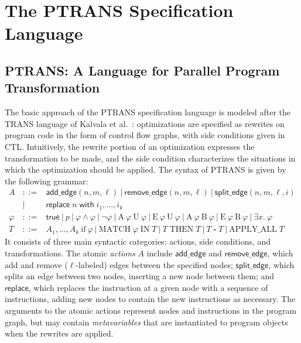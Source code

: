 \documentclass{eptcs}
\newcommand{\ignore}[1]{{}}
\newcommand{\ptrans}[0]{PTRANS}
\newcommand{\AU}[2]{\textrm{A}\ #1\ \textrm{U}\ #2}
\newcommand{\EU}[2]{\textrm{E}\ #1\ \textrm{U}\ #2}
\newcommand{\EB}[2]{\textrm{E}\ #1\ \textrm{B}\ #2}
\newcommand{\AB}[2]{\textrm{A}\ #1\ \textrm{B}\ #2}
\begin{document}
\section{The {\ptrans} Specification Language}
\label{framework}
\subsection{{\ptrans}: A Language for Parallel Program Transformation}
The basic approach of the {\ptrans} specification language is modeled after the TRANS language of Kalvala et al.~\cite{kalvala}: optimizations are specified as rewrites on program code in the form of control flow graphs, with side conditions given in \ac{CTL}.  Intuitively, the rewrite portion of an optimization expresses the transformation to be made, and the side condition characterizes the situations in which the optimization should be applied.  \ignore{Our starting point is our previous formalization of the syntax and semantics of TRANS for sequential programs \cite{transssa}.  All formalizations and proofs have been developed in the Isabelle theorem prover \cite{isabelle}, allowing us to provide strong guarantees of correctness for our verified optimizations.}
The syntax of {\ptrans} is given by the following grammar:
$$
\begin{array}{lrl}
\mathit{A}&\mathbf{::=}& \mathsf{add\_edge}(n,m,\ell)~|~\mathsf{remove\_edge}(n,m,\ell)
~|~\mathsf{split\_edge}(n,m,\ell,i) \\&|&\mathsf{replace}\;n\;\mathsf{with}\;i_1,...,i_k\\
\mathit{\varphi}\ &\mathbf{::=}& \mathsf{true}~|~p~|~\varphi \wedge \varphi~|~\neg\varphi~|~\AU{\varphi}{\varphi}~|~\EU{\varphi}{\varphi}~|~\AB{\varphi}{\varphi}~|~\EB{\varphi}{\varphi}~|~\exists x.\ \varphi\\
\mathit{T}&\mathbf{::=}& A_1,...,A_k\ \mathrm{if}\ \varphi ~|~ \mathrm{MATCH}\;\varphi\;\mathrm{IN}\;T ~|~ T\;\mathrm{THEN}\;T ~|~ T\;\square\;T ~|~ \mathrm{APPLY\_ALL}\;T
\end{array}
$$
It consists of three main syntactic categories: actions, side conditions, and transformations. The atomic \emph{actions} $A$ include $\mathsf{add\_edge}$ and $\mathsf{remove\_edge}$, which add and remove ($\ell$-labeled) edges between the specified nodes; $\mathsf{split\_edge}$, which splits an edge between two nodes, inserting a new node between them; and $\mathsf{replace}$, which replaces the instruction at a given node with a sequence of instructions, adding new nodes to contain the new instructions as necessary. \ignore{Kalvala et al. have shown that a wide variety of common program transformations can be expressed using these basic rewrites.}  The arguments to the atomic actions represent nodes and instructions in the program graph, but may contain \emph{metavariables} that are instantiated to program objects when the rewrites are applied.
\end{document}
